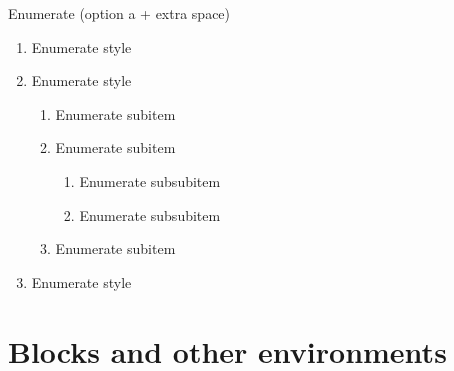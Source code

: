\documentclass[11pt,t,aspectratio=1610,nofootline]{beamer}
\begin{document}
\begin{frame}{Enumerate}
(option a + extra space)
\begin{enumerate}[a\enspace]
	\item Enumerate style
	\item Enumerate style
	\begin{enumerate}[a\enspace]
		\item Enumerate subitem
		\item Enumerate subitem
		\begin{enumerate}[a\enspace]
			\item Enumerate subsubitem
			\item Enumerate subsubitem
		\end{enumerate}
		\item Enumerate subitem
	\end{enumerate}
	\item Enumerate style
\end{enumerate}
\end{frame}







\section{Blocks and other environments}	\label{sec:blocks}
\end{document}
